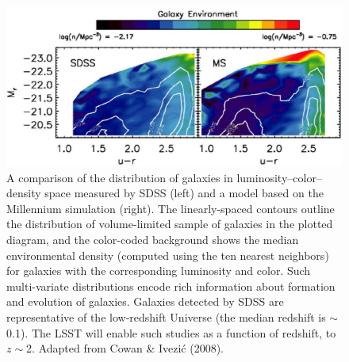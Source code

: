 \documentclass{emulateapj}
\begin{document}
\begin{figure}
\includegraphics[width=1.0\hsize,clip]{cowan.pdf}
\caption{A comparison of the distribution of galaxies in  
luminosity--color--density space measured by SDSS (left) and a model based
on the Millennium simulation (right). The linearly-spaced contours outline
the distribution of volume-limited sample of galaxies in the plotted diagram, and
the color-coded background shows the median environmental density (computed
using the ten nearest neighbors) for galaxies
with the corresponding luminosity and color. Such multi-variate distributions
encode rich information about formation and evolution of galaxies. Galaxies 
detected by SDSS are representative of the low-redshift Universe (the median 
redshift is $\sim$0.1). The LSST will enable such studies as a function of 
redshift, to $z\sim$2. Adapted from Cowan \& Ivezi\'{c} 
(2008).} 
\label{Fig:cowan}
\end{figure}
\end{document}
